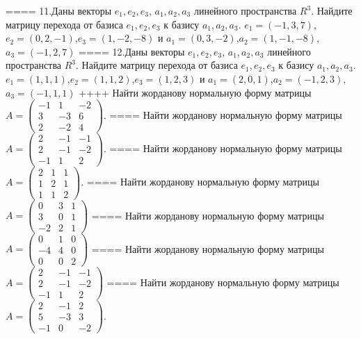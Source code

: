 ====
11.Даны векторы \(e_{1},e_{2},e_{3}\), \(a_{1},a_{2},a_{3}\) линейного пространства \(R^{3}\). Найдите матрицу перехода от базиса \(e_{1},e_{2},e_{3}\) к базису \(a_{1},a_{2},a_{3}\).
\(e_{1} = ( - 1,3,7)\),\(e_{2} = (0,2, - 1)\),\(e_{3} = (1, - 2, - 8)\) и \(a_{1} = (0,3, - 2)\),\(a_{2} = (1, - 1, - 8)\),\(a_{3} = ( - 1,2,7)\)
====
12.Даны векторы \(e_{1},e_{2},e_{3}\), \(a_{1},a_{2},a_{3}\) линейного пространства \(R^{3}\). Найдите матрицу перехода от базиса \(e_{1},e_{2},e_{3}\) к базису \(a_{1},a_{2},a_{3}\).
\(e_{1} = (1,1,1)\),\(e_{2} = (1,1,2)\),\(e_{3} = (1,2,3)\) и \(a_{1} = (2,0,1)\),\(a_{2} = ( - 1,2,3)\),\(a_{3} = ( - 1,1,1)\)
++++
Найти жорданову нормальную форму матрицы \(A = \begin{pmatrix}
 - 1 & 1 & - 2 \\
3 & - 3 & 6 \\
2 & - 2 & 4
\end{pmatrix}\).
====
Найти жорданову нормальную форму матрицы \(A = \begin{pmatrix}
2 & - 1 & - 1 \\
2 & - 1 & - 2 \\
 - 1 & 1 & 2
\end{pmatrix}\).
====
Найти жорданову нормальную форму матрицы \(A = \begin{pmatrix}
2 & 1 & 1 \\
1 & 2 & 1 \\
1 & 1 & 2
\end{pmatrix}\).
====
Найти жорданову нормальную форму матрицы \(A = \begin{pmatrix}
0 & 3 & 1 \\
3 & 0 & 1 \\
 - 2 & 2 & 1
\end{pmatrix}\)
====
Найти жорданову нормальную форму матрицы \(A = \begin{pmatrix}
0 & 1 & 0 \\
 - 4 & 4 & 0 \\
0 & 0 & 2
\end{pmatrix}\)
====
Найти жорданову нормальную форму матрицы \(A = \begin{pmatrix}
2 & - 1 & - 1 \\
2 & - 1 & - 2 \\
 - 1 & 1 & 2
\end{pmatrix}\)
====
Найти жорданову нормальную форму матрицы \(A = \begin{pmatrix}
2 & - 1 & 2 \\
5 & - 3 & 3 \\
 - 1 & 0 & - 2
\end{pmatrix}\).

